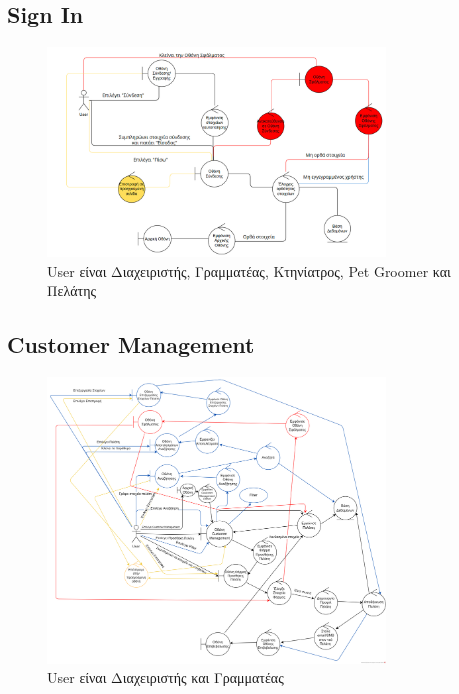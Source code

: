 \documentclass[12pt,a4paper,twoside]{book}
\begin{document}
\subsection{Sign In}
\begin{figure}[H]
    \centering
    \includegraphics[width=0.8\textwidth]{Resources/Robustness Diagram/SignIn.png}
    \caption{User είναι Διαχειριστής, Γραμματέας, Κτηνίατρος, Pet Groomer και Πελάτης}\label{fig:robustness-signin}
\end{figure}

\subsection{Customer Management}
\begin{figure}[H]
    \centering
    \includegraphics[width=0.8\textwidth]{Resources/Robustness Diagram/Customer_Management_RD.png}
    \caption{User είναι Διαχειριστής και Γραμματέας}\label{fig:robustness-customer-management}
\end{figure}
\end{document}
